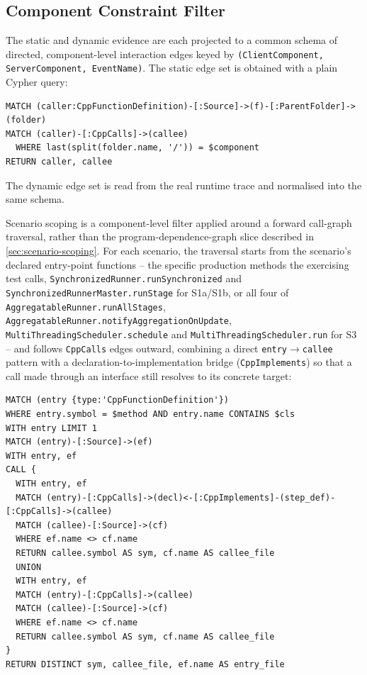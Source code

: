 \subsection{Component Constraint Filter}\label{sec:scoping-impl}

The static and dynamic evidence are each projected to a common schema of
directed, component-level interaction edges keyed by
\texttt{(ClientComponent, ServerComponent, EventName)}. The static edge
set is obtained with a plain Cypher query:

\begin{verbatim}
MATCH (caller:CppFunctionDefinition)-[:Source]->(f)-[:ParentFolder]->(folder)
MATCH (caller)-[:CppCalls]->(callee)
  WHERE last(split(folder.name, '/')) = $component
RETURN caller, callee
\end{verbatim}

The dynamic edge set is read from the real runtime trace and normalised
into the same schema.

Scenario scoping is a component-level filter applied around a forward
call-graph traversal, rather than the program-dependence-graph slice
described in \cref{sec:scenario-scoping}. For each scenario, the
traversal starts from the scenario's declared entry-point functions --
the specific production methods the exercising test calls, \eg
\texttt{SynchronizedRunner.runSynchronized} and
    \texttt{SynchronizedRunnerMaster.runStage} for S1a/S1b, or all four of
\texttt{AggregatableRunner.runAllStages},
\texttt{AggregatableRunner.notifyAggregationOnUpdate},
\texttt{MultiThreadingScheduler.schedule} and
\texttt{MultiThreadingScheduler.run} for S3 -- and follows
\texttt{CppCalls} edges outward, combining a direct
\texttt{entry}$\to$\texttt{callee} pattern with a
declaration-to-implementation bridge (\texttt{CppImplements}) so that a
call made through an interface still resolves to its concrete target:

\begin{verbatim}
MATCH (entry {type:'CppFunctionDefinition'})
WHERE entry.symbol = $method AND entry.name CONTAINS $cls
WITH entry LIMIT 1
MATCH (entry)-[:Source]->(ef)
WITH entry, ef
CALL {
  WITH entry, ef
  MATCH (entry)-[:CppCalls]->(decl)<-[:CppImplements]-(step_def)-[:CppCalls]->(callee)
  MATCH (callee)-[:Source]->(cf)
  WHERE ef.name <> cf.name
  RETURN callee.symbol AS sym, cf.name AS callee_file
  UNION
  WITH entry, ef
  MATCH (entry)-[:CppCalls]->(callee)
  MATCH (callee)-[:Source]->(cf)
  WHERE ef.name <> cf.name
  RETURN callee.symbol AS sym, cf.name AS callee_file
}
RETURN DISTINCT sym, callee_file, ef.name AS entry_file
\end{verbatim}

